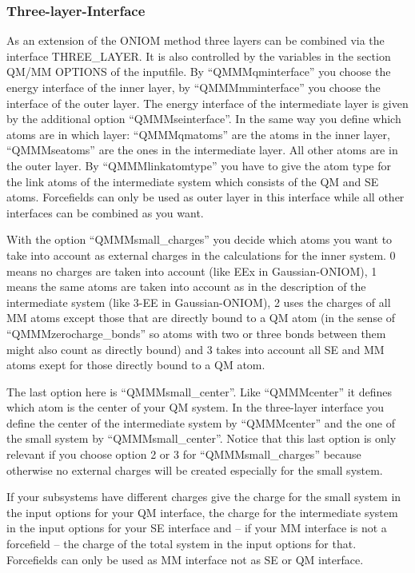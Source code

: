 \documentclass[10pt,a4paper]{article} %
\begin{document}
\subsubsection{Three-layer-Interface}

As an extension of the ONIOM method three layers can be combined via the interface THREE\_LAYER. It is also controlled by the variables in the section QM/MM OPTIONS of the inputfile. By ``QMMMqminterface'' you choose the energy interface of the inner layer, by ``QMMMmminterface'' you choose the interface of the outer layer. The energy interface of the intermediate layer is given by the additional option ``QMMMseinterface''. In the same way you define which atoms are in which layer: ``QMMMqmatoms'' are the atoms in the inner layer, ``QMMMseatoms'' are the ones in the intermediate layer. All other atoms are in the outer layer. By ``QMMMlinkatomtype'' you have to give the atom type for the link atoms of the intermediate system which consists of the QM and SE atoms. Forcefields can only be used as outer layer in this interface while all other interfaces can be combined as you want. 

With the option ``QMMMsmall\_charges'' you decide which atoms you want to take into account as external charges in the calculations for the inner system. 0 means no charges are taken into account (like EEx in Gaussian-ONIOM), 1 means the same atoms are taken into account as in the description of the intermediate system (like 3-EE in Gaussian-ONIOM), 2 uses the charges of all MM atoms except those that are directly bound to a QM atom (in the sense of ``QMMMzerocharge\_bonds'' so atoms with two or three bonds between them might also count as directly bound) and 3 takes into account all SE and MM atoms exept for those directly bound to a QM atom.

The last option here is ``QMMMsmall\_center''. Like ``QMMMcenter'' it defines which atom is the center of your QM system. In the three-layer interface you define the center of the intermediate system by ``QMMMcenter'' and the one of the small system by ``QMMMsmall\_center''. Notice that this last option is only relevant if you choose option 2 or 3 for ``QMMMsmall\_charges'' because otherwise no external charges will be created especially for the small system.

If your subsystems have different charges give the charge for the small system in the input options for your QM interface, the charge for the intermediate system in the input options for your SE interface and -- if your MM interface is not a forcefield -- the charge of the total system in the input options for that. Forcefields can only be used as MM interface not as SE or QM interface. 
\end{document}
